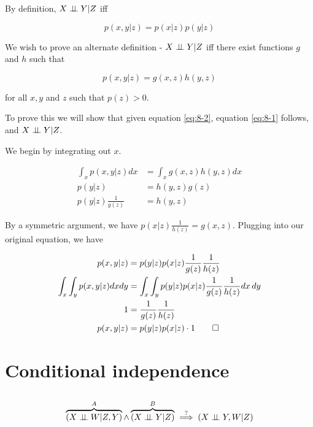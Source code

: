 \documentclass{article}
\begin{document}
\setcounter{equation}{0}

By definition, $X \perp\!\!\!\perp Y | Z$ iff

\begin{equation} \label{eq:8-1}
  p(x,y|z) = p(x|z)p(y|z)
\end{equation}

We wish to prove an alternate definition - $X \perp\!\!\!\perp Y | Z$ iff there
exist functions $g$ and $h$ such that

\begin{equation} \label{eq:8-2}
  p(x,y|z) = g(x,z)h(y,z)
\end{equation}

for all $x, y$ and $z$ such that $p(z) > 0$.

To prove this we will show that given equation \ref{eq:8-2}, equation
\ref{eq:8-1} follows, and $X \perp\!\!\!\perp Y | Z$.

We begin by integrating out $x$.

\begin{align*}
  \int_x p(x,y|z) dx &= \int_x g(x,z)h(y,z)dx \\
  p(y|z) &= h(y,z)g(z) \\
  p(y|z) \frac{1}{g(z)} &= h(y,z)
\end{align*}

By a symmetric argument, we have $p(x|z) \frac{1}{h(z)} = g(x,z)$.
Plugging into our original equation, we have

\begin{align*}
  p(x,y|z) &= p(y|z)p(x|z)\frac{1}{g(z)}\frac{1}{h(z)} \\
  \int_x \int_y p(x,y|z) dx dy &= \int_x \int_y
                                 p(y|z)p(x|z)\frac{1}{g(z)}\frac{1}{h(z)}
  dx\,dy \\
  1 &= \frac{1}{g(z)}\frac{1}{h(z)} \\
  p(x,y|z) &= p(y|z)p(x|z) \cdot 1 \qed
\end{align*}

\section{Conditional independence}

\subsection{}

\setcounter{equation}{0}

\[
\overbrace{(X \ci W | Z,Y)}^{A} \wedge \overbrace{(X \ci Y | Z)}^{B}
\stackrel{?}{\implies} (X \ci Y,W | Z)
\]
\end{document}
